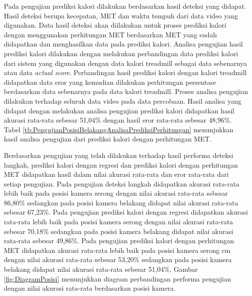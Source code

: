 Pada pengujian prediksi kalori dilakukan berdasarkan hasil deteksi yang didapat. Hasil deteksi berupa kecepatan, MET dan waktu tempuh dari data video yang digunakan. Data hasil deteksi akan diilakukan untuk proses prediksi kalori dengan menggunakan perhitungan MET berdasarkan MET yang sudah didapatkan dan menghasilkan data pada prediksi kalori. Analisa pengujian hasil prediksi kalori dilakukan dengan melakukan perbandingan data prediksi kalori dari sistem yang digunakan dengan data kalori treadmill sebagai data sebenarnya atau data \emph{actual score}. Perbandingan hasil prediksi kalori dengan kalori treadmill didapatkan data eror yang kemudian dilakukan perhitungan persentase berdasarkan data sebenarnya pada data kalori treadmill. Proses analisa pengujian dilakukan terhadap seluruh data video pada data percobaan. Hasil analisa yang didapat dengan melakukan analisa pengujian prediksi kalori didapatkan hasil akurasi rata-rata sebesar 51,04\% dengan hasil eror rata-rata sebesar 48,96\%. Tabel \ref{tb:PengujianPosisiBelakangAnalisaPrediksiPerhitungan} menunjukkan hasil analisa pengujian dari prediksi kalori dengan perhitungan MET.

Berdasarkan pengujian yang telah dilakukan terhadap hasil performa deteksi langkah, prediksi kalori dengan regresi dan prediksi kalori dengan perhitungan MET didapatkan hasil dalam nilai akurasi rata-rata dan eror rata-rata dari setiap pengujian. Pada pengujian deteksi langkah didapatkan akurasi rata-rata lebih baik pada posisi kamera serong dengan nilai akurasi rata-rata sebesar 86,80\% sedangkan pada posisi kamera belakang didapat nilai akurasi rata-rata sebesar 67,23\%. Pada pengujian prediksi kalori dengan regresi didapatkan akurasi rata-rata lebih baik pada posisi kamera serong dengan nilai akurasi rata-rata sebesar 70,18\% sedangkan pada posisi kamera belakang didapat nilai akurasi rata-rata sebesar 49,86\%. Pada pengujian prediksi kalori dengan perhitungan MET didapatkan akurasi rata-rata lebih baik pada posisi kamera serong cm dengan nilai akurasi rata-rata sebesar 53,20\% sedangkan pada posisi kamera belakang didapat nilai akurasi rata-rata sebesar 51,04\%. Gambar \ref{fig:DiagramPosisi} menunjukkan diagram perbandingan performa pengujian dengan nilai akurasi rata-rata berdasarkan posisi kamera.

